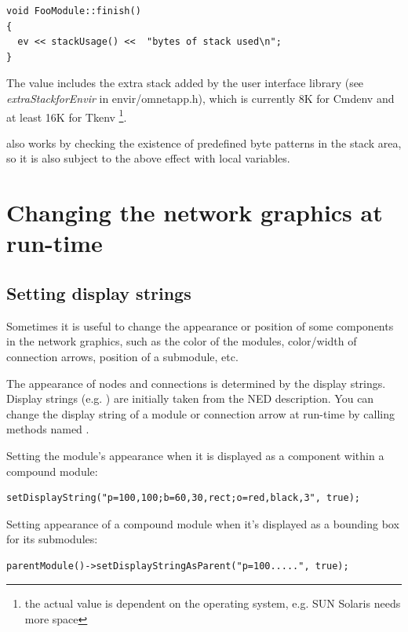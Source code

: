 \begin{verbatim}
void FooModule::finish()
{
  ev << stackUsage() <<  "bytes of stack used\n";
}
\end{verbatim}


The value includes the extra stack added by the user interface library
(see \textit{extraStackforEnvir} in
envir/omnetapp.h), which is currently 8K for Cmdenv and at least 16K
for Tkenv \footnote{the actual value is dependent on the operating
  system, e.g.  SUN Solaris needs more space}.

also works by checking the existence of predefined
byte patterns in the stack area, so it is also subject to the above
effect with local variables.


\section{Changing the network graphics at run-time}

\subsection{Setting display strings}

Sometimes it is useful to change the appearance or position of
some components in the network graphics, such as the color of the
modules, color/width of connection arrows,
position of a submodule, etc.

The appearance of nodes and connections is determined by the display
strings. Display strings (e.g. )
are initially taken from the NED description.
You can change the display string of a module or connection arrow
at run-time by calling methods named .

Setting the module's appearance when it is displayed as a component
within a compound module:

\begin{verbatim}
setDisplayString("p=100,100;b=60,30,rect;o=red,black,3", true);
\end{verbatim}

Setting appearance of a compound module when it's displayed as a
bounding box for its submodules:

\begin{verbatim}
parentModule()->setDisplayStringAsParent("p=100.....", true);
\end{verbatim}

